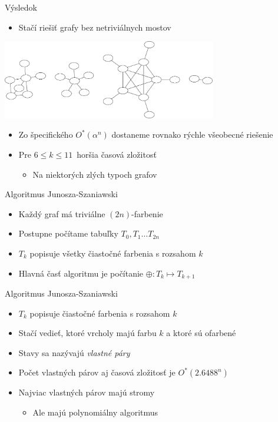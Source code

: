 \documentclass[slovak]{beamer}
\begin{document}
\begin{frame}{Výsledok}
    \begin{itemize}
        \item Stačí riešiť grafy bez netriviálnych mostov
    \end{itemize}
    \begin{center}
        \includegraphics[width=0.7\textwidth]{grafy/ec2-example.pdf}
    \end{center}
    \begin{itemize}
        \item Zo špecifického $O^*(\alpha^n)$ dostaneme rovnako
        rýchle všeobecné riešenie
        \item Pre $6 \leq k \leq 11$ horšia časová zložitosť
        \begin{itemize}
            \item Na niektorých zlých typoch grafov
        \end{itemize}
    \end{itemize}
\end{frame}

\begin{frame}{Algoritmus Junosza-Szaniawski}
    \begin{itemize}
        \item Každý graf má triviálne $(2n)$-farbenie
        \item Postupne počítame tabuľky $T_0, T_1 \ldots T_{2n}$
        \item $T_k$ popisuje všetky čiastočné farbenia s rozsahom $k$
        \item Hlavná časť algoritmu je počítanie $\oplus: T_k \mapsto T_{k+1}$
    \end{itemize}
\end{frame}

\begin{frame}{Algoritmus Junosza-Szaniawski}
    \begin{itemize}
        \item $T_k$ popisuje čiastočné farbenia s rozsahom $k$
        \item Stačí vedieť, ktoré vrcholy majú farbu $k$ a ktoré sú ofarbené
        \item Stavy sa nazývajú \emph{vlastné páry}
        \item Počet vlastných párov aj časová zložitosť je $O^*(2.6488^n)$
        \item Najviac vlastných párov majú stromy
        \begin{itemize}
            \item Ale majú polynomiálny algoritmus
        \end{itemize}
    \end{itemize}
\end{frame}
\end{document}
